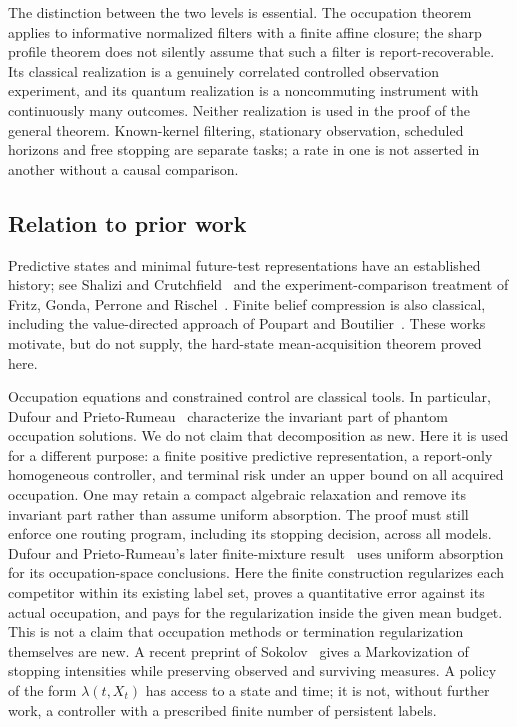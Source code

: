 The distinction between the two levels is essential. The occupation theorem applies to informative normalized filters with a finite affine closure; the sharp profile theorem does not silently assume that such a filter is report-recoverable. Its classical realization is a genuinely correlated controlled observation experiment, and its quantum realization is a noncommuting instrument with continuously many outcomes. Neither realization is used in the proof of the general theorem. Known-kernel filtering, stationary observation, scheduled horizons and free stopping are separate tasks; a rate in one is not asserted in another without a causal comparison.

\subsection*{Relation to prior work}
Predictive states and minimal future-test representations have an established history; see Shalizi and Crutchfield~\cite{SC} and the experiment-comparison treatment of Fritz, Gonda, Perrone and Rischel~\cite{FGPR}. Finite belief compression is also classical, including the value-directed approach of Poupart and Boutilier~\cite{PB}. These works motivate, but do not supply, the hard-state mean-acquisition theorem proved here.

Occupation equations and constrained control are classical tools. In particular, Dufour and Prieto-Rumeau~\cite{DPR} characterize the invariant part of phantom occupation solutions. We do not claim that decomposition as new. Here it is used for a different purpose: a finite positive predictive representation, a report-only homogeneous controller, and terminal risk under an upper bound on all acquired occupation. One may retain a compact algebraic relaxation and remove its invariant part rather than assume uniform absorption. The proof must still enforce one routing program, including its stopping decision, across all models. Dufour and Prieto-Rumeau's later finite-mixture result~\cite{DPRG} uses uniform absorption for its occupation-space conclusions. Here the finite construction regularizes each competitor within its existing label set, proves a quantitative error against its actual occupation, and pays for the regularization inside the given mean budget. This is not a claim that occupation methods or termination regularization themselves are new. A recent preprint of Sokolov~\cite{Sokolov} gives a Markovization of stopping intensities while preserving observed and surviving measures. A policy of the form $\lambda(t,X_t)$ has access to a state and time; it is not, without further work, a controller with a prescribed finite number of persistent labels.

